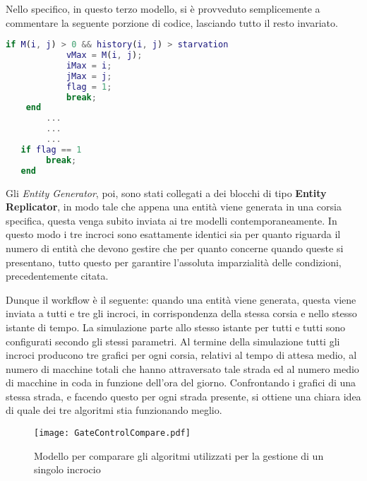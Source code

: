 Nello specifico, in questo terzo modello, si è provveduto semplicemente a commentare la seguente porzione di codice, lasciando tutto il resto invariato.
\newline
\begin{lstlisting}[language=Matlab,label=starvation,caption= Porzione di codice relativa alla gestione della starvation]
    if M(i, j) > 0 && history(i, j) > starvation
            vMax = M(i, j);
            iMax = i;
            jMax = j;
            flag = 1;
            break;
    end
        ...
        ...
        ...
   if flag == 1
        break;
   end
\end{lstlisting}

Gli \textit{Entity Generator}, poi, sono stati collegati a dei blocchi di tipo \textbf{Entity Replicator\cite{entityreplicator}}, in modo tale che appena una entità viene generata in una corsia specifica, questa venga subito inviata ai tre modelli contemporaneamente. In questo modo i tre incroci sono esattamente identici sia per quanto riguarda il numero di entità che devono gestire che per quanto concerne quando queste si presentano, tutto questo per garantire l'assoluta imparzialità delle condizioni, precedentemente citata.
\newline

Dunque il workflow è il seguente: quando una entità viene generata, questa viene inviata a tutti e tre gli incroci, in corrispondenza della stessa corsia e nello stesso istante di tempo. La simulazione parte allo stesso istante per tutti e tutti sono configurati secondo gli stessi parametri. Al termine della simulazione tutti gli incroci producono tre grafici per ogni corsia, relativi al tempo di attesa medio, al numero di macchine totali che hanno attraversato tale strada ed al numero medio di macchine in coda in funzione dell'ora del giorno. Confrontando i grafici di una stessa strada, e facendo questo per ogni strada presente, si ottiene una chiara idea di quale dei tre algoritmi stia funzionando meglio.

\newpage

\begin{figure}[H]
  \texttt{[image: GateControlCompare.pdf]}
  \caption{Modello per comparare gli algoritmi utilizzati per la gestione di un singolo incrocio}
  \label{fig:gatecontrolcompare}
\end{figure}

\newpage
